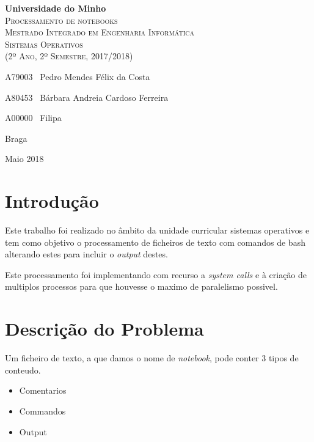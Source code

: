 \documentclass[10pt,a4paper]{article}
\begin{document}
\newcommand{\outputStart}[0]{$>>>$}
\newcommand{\outputEnd}[0]{$<<<$}

\begin{titlepage}
    \center
    {\huge {\bf Universidade do Minho}}\\[0.4cm]
    \vspace{3.0cm}
    \textsc{\huge{Processamento de notebooks}}\\[0.5cm]
    \vspace{3.0cm}
    \textsc{\huge{Mestrado Integrado em Engenharia Informática}}\\[0.5cm]
    \vspace{2.0cm}
    \textsc{Sistemas Operativos}\\[0.5cm]
    \textsc{(2º Ano, 2º Semestre, 2017/2018)}\\[0.5cm]
    \vspace{1.5cm}
    \begin{flushleft}
        A79003 \,\,\,Pedro Mendes Félix da Costa
        \vspace{0.2cm}

        A80453 \,\,\,Bárbara Andreia Cardoso Ferreira
        \vspace{0.2cm}

        A00000 \,\,\,Filipa
    \end{flushleft}
        \vspace{1cm}
    \begin{flushright}
        Braga

        Maio 2018
    \end{flushright}

\end{titlepage}

\tableofcontents
\clearpage

\section{Introdução}
    Este trabalho foi realizado no âmbito da unidade curricular sistemas
    operativos e tem como objetivo o processamento de ficheiros de texto
    com comandos de bash alterando estes para incluir o \textit{output} destes.

    Este processamento foi implementando com recurso a \textit{system calls}
    e à criação de multiplos processos para que houvesse o maximo de
    paralelismo possivel.

\section{Descrição do Problema}
    Um ficheiro de texto, a que damos o nome de \textit{notebook}, pode conter
    3 tipos de conteudo.
    \begin{itemize}
            \item Comentarios
            \item Commandos
            \item Output
    \end{itemize}
\end{document}
